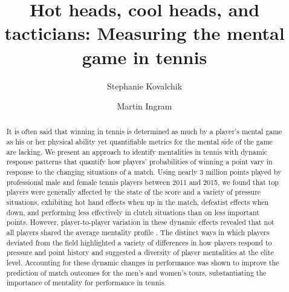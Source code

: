 \documentclass{Latex/svjour3}
\begin{document}
\title{Hot heads, cool heads, and tacticians: Measuring the mental game in
  tennis}



\author{Stephanie Kovalchik\and Martin Ingram}


\date{}

\maketitle

\begin{abstract}

It is often said that winning in tennis is determined as much by a player's
mental game as his or her physical ability yet quantifiable metrics for the
mental side of the game are lacking. We present an approach to identify
mentalities in tennis with dynamic response patterns that quantify how players'
probabilities of winning a point vary in response to the changing situations of
a match. Using nearly 3 million points played by professional male and female
tennis players between 2011 and 2015, we found that top players  were generally affected by the state of the score
and a variety of pressure situations, exhibiting hot hand effects when up in the
match, defeatist effects when down, and performing less effectively in clutch
situations than on less important points. However, player-to-player variation in
these dynamic effects revealed that not all players shared the average mentality
profile . The distinct ways in which
players deviated from the field highlighted a variety of differences in how
players respond to pressure and point history and suggested a diversity of
player mentalities at the elite level. Accounting for these dynamic changes in
performance was shown to improve the prediction of match outcomes for the men's
and women's tours, substantiating the importance of mentality for performance in
tennis.


\end{abstract}
\end{document}
